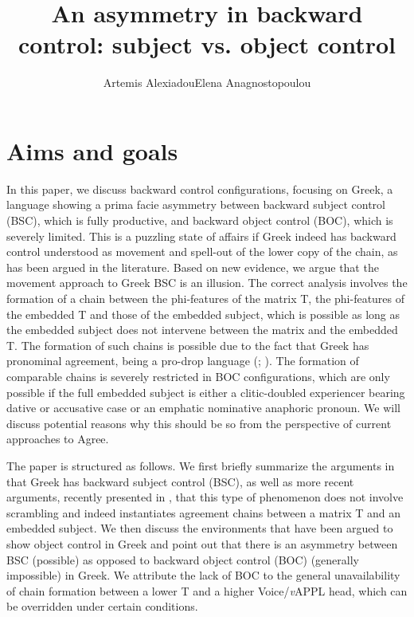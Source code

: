 \documentclass[output=paper]{langsci/langscibook}
\author{Artemis Alexiadou\affiliation{Humboldt-Universität zu Berlin\\Leibniz-Zentrum Allgemeine Sprachwissenschaft, Berlin}\lastand Elena Anagnostopoulou\affiliation{University of Crete}}
\title{An asymmetry in backward control: subject vs. object control}
\begin{document}
\citereset

 

\section{Aims and goals}

In this paper, we discuss backward control configurations, focusing on Greek, a language showing a prima facie asymmetry between backward subject control (BSC), which is fully productive, and backward object control (BOC), which is severely limited. This is a puzzling state of affairs if Greek indeed has backward control understood as movement and spell-out of the lower copy of the chain, as has been argued in the literature. Based on new evidence, we argue that the movement approach to Greek BSC is an illusion. The correct analysis involves the formation of a chain between the phi-features of the matrix T, the phi-features of the embedded T and those of the embedded subject, which is possible as long as the embedded subject does not intervene between the matrix and the embedded T. The formation of such chains is possible due to the fact that Greek has pronominal agreement, being a pro-drop language (\citealt{Alexiadou1998}; \citealt{Barbosa2009}). The formation of comparable chains is severely restricted in BOC configurations, which are only possible if the full embedded subject is either a clitic-doubled experiencer bearing dative or accusative case or an emphatic nominative anaphoric pronoun. We will discuss potential reasons why this should be so from the perspective of current approaches to Agree.

The paper is structured as follows. We first briefly summarize the arguments in \citet{Alexiadou2010} that Greek has backward subject control (BSC), as well as more recent arguments, recently presented in \citet{Tsakali2017}, that this type of phenomenon does not involve scrambling and indeed instantiates agreement chains between a matrix T and an embedded subject. We then discuss the environments that have been argued to show object control in Greek and point out that there is an asymmetry between BSC (possible) as opposed to backward object control (BOC) (generally impossible) in Greek. We attribute the lack of BOC to the general unavailability of chain formation between a lower T and a higher Voice\slash \textit{v}APPL head, which can be overridden under certain conditions.
\end{document}
